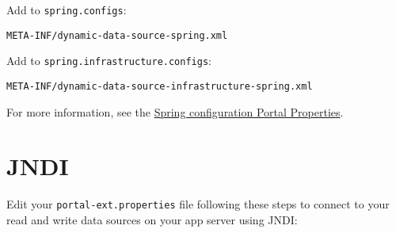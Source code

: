 \begin{enumerate}
  Add to \texttt{spring.configs}:

\begin{verbatim}
META-INF/dynamic-data-source-spring.xml
\end{verbatim}

  Add to \texttt{spring.infrastructure.configs}:

\begin{verbatim}
META-INF/dynamic-data-source-infrastructure-spring.xml
\end{verbatim}

  For more information, see the
  \href{https://docs.liferay.com/portal/7.2-latest/propertiesdoc/portal.properties.html\#Spring}{Spring
  configuration Portal Properties}.
\end{enumerate}

\section{JNDI}\label{jndi}

Edit your \texttt{portal-ext.properties} file following these steps to
connect to your read and write data sources on your app server using
JNDI:

